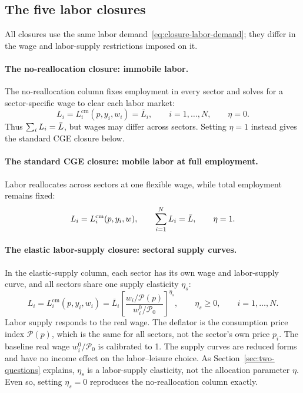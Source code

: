 \subsection{The five labor closures}\label{app:labor-closures}

All closures use the same labor demand~\eqref{eq:closure-labor-demand}; they
differ in the wage and labor-supply restrictions imposed on it.

\paragraph{The no-reallocation closure: immobile labor.}
The no-reallocation column fixes employment in every sector and solves for a sector-specific wage to clear each labor market:
\begin{equation}
L_i = L_i^{\mathrm{cm}}(p,y_i,w_i) = \bar{L}_i,
\qquad i=1,\ldots,N, \qquad \eta = 0.
\label{eq:closure-bf}
\end{equation}
Thus $\sum_i L_i = \bar{L}$, but wages may differ across sectors. Setting $\eta = 1$ instead gives the standard CGE closure below.

\paragraph{The standard CGE closure: mobile labor at full employment.}
Labor reallocates across sectors at one flexible wage, while total
employment remains fixed:
\begin{equation}
L_i = L_i^{\mathrm{cm}}(p,y_i,w),
\qquad \sum_{i=1}^N L_i = \bar{L},
\qquad \eta = 1.
\label{eq:closure-alpha}
\end{equation}

\paragraph{The elastic labor-supply closure: sectoral supply curves.}
In the elastic-supply column, each sector has its own wage and labor-supply curve, and all sectors share one supply elasticity $\eta_s$:
\begin{equation}
L_i = L_i^{\mathrm{cm}}(p,y_i,w_i)
 = \bar{L}_i \left[\frac{w_i/\mathcal{P}(p)}{w_i^{0}/\mathcal{P}_0}\right]^{\eta_s},
\qquad \eta_s \geq 0, \qquad i=1,\ldots,N.
\label{eq:closure-beta}
\end{equation}
Labor supply responds to the real wage. The deflator is the consumption price index $\mathcal{P}(p)$, which is the same for all sectors, not the sector's own price $p_i$. The baseline real wage $w_i^{0}/\mathcal{P}_0$ is calibrated to 1. The supply curves are reduced forms and have no income effect on the labor--leisure choice. As Section~\ref{sec:two-questions} explains, $\eta_s$ is a labor-supply elasticity, not the allocation parameter $\eta$. Even so, setting $\eta_s = 0$ reproduces the no-reallocation column exactly.

